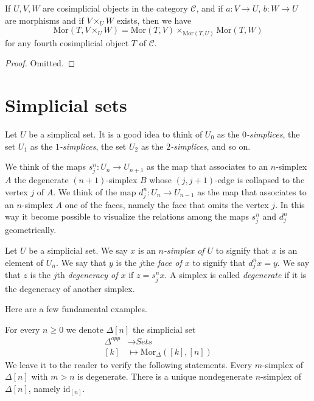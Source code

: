 \begin{lemma}
\label{lemma-fibre-product-cosimplicial-objects}
If $U, V, W$ are cosimplicial objects in the category $\mathcal{C}$,
and if $a : V \to U$, $b : W \to U$ are morphisms
and if $V\times_U W$ exists, then we have
$$
\text{Mor}(T, V\times_U W) =
\text{Mor}(T, V) \times_{\text{Mor}(T, U)}
\text{Mor}(T, W)
$$
for any fourth cosimplicial object $T$ of $\mathcal{C}$.
\end{lemma}

\begin{proof}
Omitted.
\end{proof}














\section{Simplicial sets}
\label{section-simplicial-set}

\noindent
Let $U$ be a simplical set. It is a good idea to think of
$U_0$ as the {\it $0$-simplices}, the set $U_1$ as the
{\it $1$-simplices},
the set $U_2$ as the {\it $2$-simplices}, and so on.

\medskip\noindent
We think of the maps $s^n_j : U_n \to U_{n + 1}$ as
the map that associates to an $n$-simplex $A$ the degenerate
$(n + 1)$-simplex $B$ whose $(j, j + 1)$-edge is collapsed
to the vertex $j$ of $A$. We think of the map $d^n_j : U_n \to U_{n - 1}$
as the map that associates to an $n$-simplex $A$ one of the
faces, namely the face that omits the vertex $j$.
In this way it become possible to visualize the relations
among the maps $s^n_j$ and $d^n_j$ geometrically.

\begin{definition}
\label{definition-terminology-simplicial-sets}
Let $U$ be a simplicial set.
We say $x$ is an {\it $n$-simplex of $U$} to signify that
$x$ is an element of $U_n$. We say that $y$ is the $j$the
{\it face of $x$} to signify that $d^n_jx = y$. We say that
$z$ is the $j$th {\it degeneracy of $x$} if $z = s^n_jx$.
A simplex is called {\it degenerate} if it is the degeneracy
of another simplex.
\end{definition}

\noindent
Here are a few fundamental examples.

\begin{example}
\label{example-simplex-simplicial-set}
For every $n \geq 0$ we denote $\Delta[n]$ the simplicial set
\begin{align*}
\Delta^{opp} & \longrightarrow \textit{Sets} \\
[k] & \longmapsto \text{Mor}_{\Delta}([k], [n])
\end{align*}
We leave it to the reader to verify the following statements.
Every $m$-simplex of $\Delta[n]$ with $m > n$ is degenerate.
There is a unique nondegenerate $n$-simplex of $\Delta[n]$,
namely $\text{id}_{[n]}$.
\end{example}

